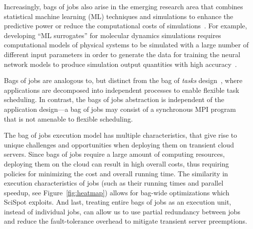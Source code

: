 Increasingly, bags of jobs also arise in the emerging research area that combines statistical machine learning (ML) techniques and simulations to enhance the predictive power or reduce the
computational costs of simulations~\cite{ferguson2017machine,wang2019machine,casalino2021ai,moradzadeh2019molecular,kadupitiya2020machine,kadupitiya2020machine2}. %
For example, developing ``ML surrogates'' for molecular dynamics simulations requires computational models of physical systems to be simulated with a large number of different input parameters in order to generate the data for training the neural network models to produce simulation output quantities with high accuracy~\cite{kadupitiya2020machine2}. 



Bags of jobs are analogous to, but distinct from the bag of \emph{tasks} design~\cite{bot-2003}, where applications are decomposed into independent processes to enable flexible task scheduling. 
In contrast, the bags of jobs abstraction is independent of the application design---a bag of jobs may consist of a synchronous MPI program that is not amenable to flexible scheduling. 




The bag of jobs execution model has multiple characteristics, that give rise to unique challenges and opportunities when deploying them on transient cloud servers. 
Since bags of jobs require a large amount of computing resources, deploying them on the cloud can result in high overall costs, thus requiring policies for minimizing the cost and overall running time. 
The similarity in execution characteristics of jobs (such as their running times and parallel speedup, see Figure~\ref{fig:heatmap}) allows for bag-wide optimizations which SciSpot exploits. 
And last, treating entire bags of jobs as an execution unit, instead of individual jobs, can allow us to use partial redundancy between jobs and reduce the fault-tolerance overhead to mitigate transient server preemptions. 



